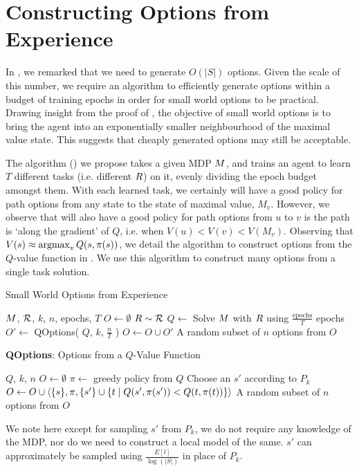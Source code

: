 \section{Constructing Options from Experience} 
\label{sec:algo}

In , we remarked that we need to generate $O(|S|)$
options. Given the scale of this number, we require an algorithm to
efficiently generate options within a budget of training epochs in order
for small world options to be practical. Drawing insight from the proof
of , the objective of small world options is to
bring the agent into an exponentially smaller neighbourhood of the
maximal value state. This suggests that cheaply generated options may
still be acceptable.

The algorithm () we propose takes
a given MDP $M$, and trains an agent to learn $T$ different tasks
(i.e. different $R$) on it, evenly dividing the epoch budget
amongst them. With each learned task, we certainly will have a good policy
for path options from any state to the state of maximal value, $M_v$.
However, we observe that will also have a good policy for path options
from $u$ to $v$ is the path is `along the gradient' of $Q$, i.e. when
$V(u) < V(v) < V(M_v)$. Observing that $V(s) \approx \operatorname{argmax}_{v}
Q(s,\pi(s))$, we detail the algorithm to construct options from the
$Q$-value function in . We use this algorithm to
construct many options from a single task solution.

\begin{algorithm}[H]
  \caption{Small World Options from Experience}
  \label{algo:small-world-experience}
  \begin{algorithmic}[1]
      \REQUIRE $M$, $\mathcal{R}$, $k$, $n$, epochs, $T$
      \STATE $O \gets \emptyset$
        \STATE $R \sim \mathcal{R}$
        \STATE $Q \gets $ Solve $M$ with $R$ using
            $\frac{\textrm{epochs}}{T}$ epochs
        \STATE $O' \gets $ QOptions( $Q$, $k$,
            $\frac{n}{T}$ )
        \STATE $O \gets O \cup O'$
      \ENDFOR
      \RETURN A random subset of $n$ options from $O$
  \end{algorithmic}
\end{algorithm}
\begin{algorithm}[H]
  \caption{{\bf QOptions}: Options from a $Q$-Value Function}
  \label{algo:qoptions}
  \begin{algorithmic}[1]
      \REQUIRE $Q$, $k$, $n$
      \STATE $O \gets \emptyset$
      \STATE $\pi \gets $ greedy policy from $Q$
        \STATE Choose an $s'$ according to $P_k$
          \STATE $O \gets O \cup \langle \{s\}, \pi, \{s'\} \cup \{t \mid Q(s',\pi(s')) < Q(t, \pi(t))\}  \rangle$
        \ENDIF
      \RETURN A random subset of $n$ options from $O$
  \end{algorithmic}
\end{algorithm}

We note here except for sampling $s'$ from $P_k$, we do not require any
knowledge of the MDP, nor do we need to construct a local model of the
same. $s'$ can approximately be sampled using $\frac{E[l]}{\log(|S|)}$
in place of $P_k$. 

